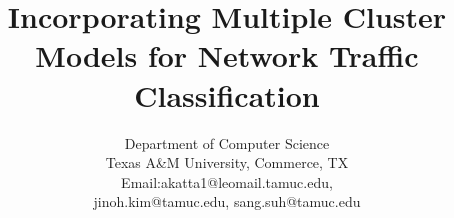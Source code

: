 \documentclass[conference]{IEEEtran}
\begin{document}
%
\title{Incorporating Multiple Cluster Models for Network Traffic Classification}


\author{
	\IEEEauthorblockA
	{Department of Computer Science \\
		Texas A\&M University,
		Commerce, TX\\
		Email:akatta1@leomail.tamuc.edu, \\
		jinoh.kim@tamuc.edu, sang.suh@tamuc.edu}
	\and
}

%








\maketitle
\end{document}
